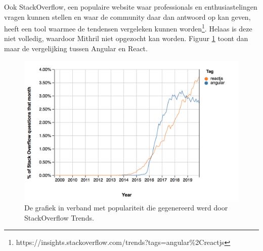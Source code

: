 Ook StackOverflow, een populaire website waar professionals en enthusiastelingen vragen kunnen stellen en waar de community daar dan antwoord op kan geven, heeft een tool waarmee de tendensen vergeleken kunnen worden\footnote{https://insights.stackoverflow.com/trends?tags=angular\%2Creactjs}. Helaas is deze niet volledig, waardoor Mithril niet opgezocht kan worden. Figuur \ref{fig:stackoverflowtrends} toont dan maar de vergelijking tussen Angular en React. 

\begin{figure}
    \includegraphics[width=\textwidth]{./img/stackoverflowtrends.png}
    \caption{De grafiek in verband met populariteit die gegenereerd werd door StackOverflow Trends.}
    \label{fig:stackoverflowtrends}
\end{figure}


